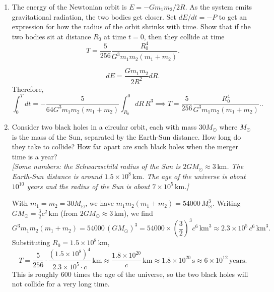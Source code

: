 \begin{enumerate}[label=\roman*)]
\begin{solution}
    \end{solution}
    \item The energy of the Newtonian orbit is $E = -Gm_1 m_2/2R$. As the system emits gravitational radiation, the two bodies get closer. Set $dE/dt = -P$ to get an expression for how the radius of the orbit shrinks with time. Show that if the two bodies sit at distance $R_0$ at time $t=0$, then they collide at time
    \begin{equation}
        T = \frac{5}{256}\frac{R_0^4}{G^3 m_1 m_2(m_1+m_2)}.
    \end{equation}
    \begin{solution}
        \begin{equation}
            dE = \frac{Gm_1m_2}{2R^2}dR.
        \end{equation}
        Therefore,
        \begin{equation}
            \int_0^Tdt = -\frac{5}{64G^3m_1m_2(m_1+m_2)}\int_{R_0}^0 dR\, R^3 \implies T = \frac{5}{256}\frac{R_0^4}{G^3 m_1 m_2(m_1+m_2)}..
        \end{equation}
    \end{solution}
    \item Consider two black holes in a circular orbit, each with mass $30M_\odot$ where $M_\odot$ is the mass of the Sun, separated by the Earth-Sun distance. How long do they take to collide? How far apart are such black holes when the merger time is a year?\\
    \textit{[Some numbers: the Schwarzschild radius of the Sun is $2GM_\odot\approx 3\,\mathrm{km}$. The Earth-Sun distance is around $1.5\times 10^8\,\mathrm{km}$. The age of the universe is about $10^{10}$ years and the radius of the Sun is about $7\times 10^5\,\mathrm{km}$.]}
    \begin{solution}
        With $m_1 = m_2 = 30M_\odot$, we have $m_1m_2(m_1+m_2) = 54000\,M_\odot^3$. Writing $GM_\odot = \frac{3}{2}c^2\,\text{km}$ (from $2GM_\odot \approx 3\,\text{km}$), we find
        \begin{equation}
            G^3m_1m_2(m_1+m_2) = 54000\,(GM_\odot)^3 = 54000\times\left(\frac{3}{2}\right)^3 c^6\,\text{km}^3 \approx 2.3\times 10^5\, c^6\,\text{km}^3.
        \end{equation}
        Substituting $R_0 = 1.5\times 10^8\,\text{km}$,
        \begin{equation}
            T = \frac{5}{256}\cdot\frac{(1.5\times 10^8)^4}{2.3\times 10^5\cdot c}\,\text{km} \approx \frac{1.8\times 10^{20}}{c}\,\text{km} \approx 1.8\times 10^{20}\,\text{s} \approx 6\times 10^{12}\,\text{years}.
        \end{equation}
        This is roughly $600$ times the age of the universe, so the two black holes will not collide for a very long time.
    

\end{solution}
\end{enumerate}
